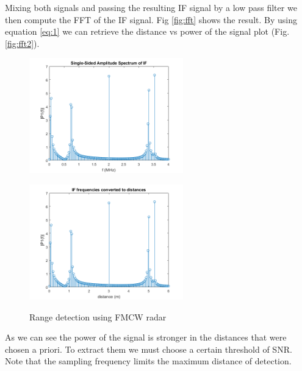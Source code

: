 Mixing both signals and passing the resulting \ac{IF} signal by a low pass filter we then compute the \ac{FFT} of the \ac{IF} signal. Fig \ref{fig:fft} shows the result. By using equation \ref{eq:1} we can retrieve the distance vs power of the signal plot (Fig. \ref{fig:fft2}). 
\begin{figure}[ht] 
    \begin{minipage}[b]{.49\linewidth}
        \includegraphics[height=5cm,width=\linewidth]{imgs/chapter2/FFT.png}
        \label{fig:fft}
    \end{minipage}
    \begin{minipage}[b]{.49\linewidth}
        \includegraphics[height=5cm,width=\linewidth]{imgs/chapter2/distance.png}
        \label{fig:fft2}
    \end{minipage}
    \caption{Range detection using \ac{FMCW} \ac{radar}}
    \label{fig:distancedetermination}
\end{figure}
As we can see the power of the signal is stronger in the distances that were chosen a priori. To extract them we must choose a certain threshold of \ac{SNR}. Note that the sampling frequency limits the maximum distance of detection.


